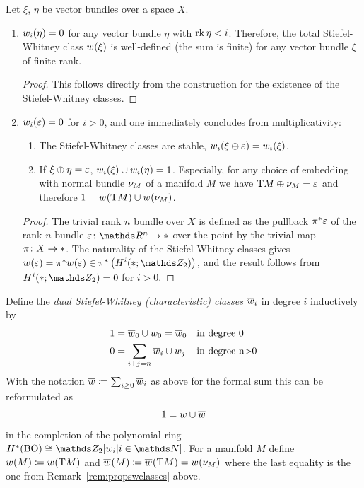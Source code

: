 \begin{Rem}
  \label{rem:propswclasses}
  Let $\xi$, $\eta$ be vector bundles over a space $X$.
  \begin{enumerate} 
  \item ${w_{i}}(\eta) = 0$
    for any vector bundle $\eta$ with $\operatorname{rk}\eta < i$.
    Therefore, the total Stiefel-Whitney class ${w_{}}(\xi)$ is
    well-defined (\idest the sum is finite)
    for any vector bundle $\xi$ of finite rank.
    \begin{proof}
      This follows directly from the construction for the existence of
      the Stiefel-Whitney classes.
    \end{proof}
  \item ${w_{i}}(\varepsilon)=0$ for $i>0$, and one immediately concludes
    from multiplicativity:
    \begin{enumerate}
    \item The Stiefel-Whitney classes are stable, \idest
      ${w_{i}}(\xi\oplus\varepsilon) = {w_{i}}(\xi)$.
    \item\label{item:wuclassmfdinverse}
      If $\xi\oplus\eta = \varepsilon$, ${w_{i}}(\xi)\cup{w_{i}}(\eta)=1$.
      Especially, for any choice of embedding with normal bundle $\nu_{M}$
      of a manifold $M$ we have $\mathrm{T}M \oplus \nu_{M} = \varepsilon$ and
      therefore $1 = {w_{}}(\mathrm{T}M) \cup {w_{}}(\nu_{M})$.
    \end{enumerate}
    \begin{proof}
      The trivial rank $n$ bundle over $X$ is defined as the pullback
      ${\pi}^* \varepsilon$ of the rank $n$ bundle
      $\trivbdl\colon \R^n\to\pt$ over the point by the trivial map
      $\pi\colon X\to*$. The naturality of the Stiefel-Whitney
      classes gives $\W{\trivbdl} = \pb\pi \W{\trivbdl}
      \in\pb\pi \left(\H^i(\pt;\Zmod2)\right)$,
      and the result follows from $\H^i(\pt;\Zmod2) = 0$ for $i>0$.
    \end{proof}
  \end{enumerate}
\end{Rem}

\begin{Def}
  Define the \emph{dual Stiefel-Whitney (characteristic) classes}
  $\overline{w}_{i}$ in degree $i$ inductively by
  \begin{align*}
    1 &= \overline{w}_{0}\cup w_{0} = \overline{w}_{0}    &&\text{in degree 0}\\
    0 &= \sum_{i+j=n} \overline{w}_{i}\cup w_{j}  &&\text{in degree n>0}
  \end{align*}
  With the notation $\overline{w}\coloneqq \sum_{i\geq0} \overline{w}_{i}$ as above
  for the formal sum this can be reformulated as
  \begin{gather*}
    1 = w\cup\overline{w}
  \end{gather*}
  in the completion of the polynomial ring $\H^*(\BO)\cong\Zmod2[\ws{i}|i\in\Nat]$.
  For a manifold $M$ define
  ${w_{}}(M) \coloneqq {w_{}}(\mathrm{T}M)$ and
  ${\overline{w}_{}}(M) \coloneqq {\overline{w}_{}}(\mathrm{T}M) = {w_{}}(\nu_{M})$
  where the last equality is the one from
  Remark~\autoref{rem:propswclasses} above.
\end{Def}

